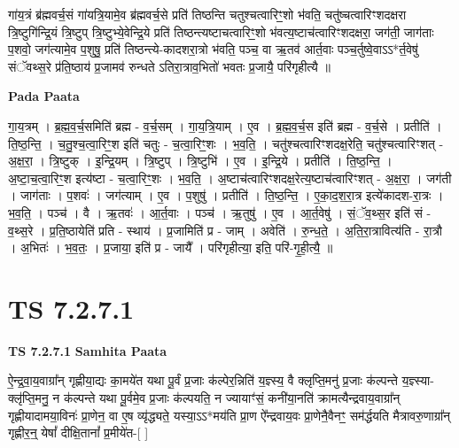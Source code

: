 \documentclass[17pt]{extarticle}
\begin{document}
गा॑य॒त्रं ब्र॑ह्मवर्च॒सं गा॑यत्रि॒यामे॒व ब्र॑ह्मवर्च॒से प्रति॑ तिष्ठन्ति चतुश्चत्वारिꣳ॒॒शो भ॑वति॒ चतु॑ष्चत्वारिꣳशदक्षरा त्रि॒ष्टुगि॑न्द्रि॒यं त्रि॒ष्टुप् त्रि॒ष्टुभ्ये॒वेन्द्रि॒ये प्रति॑ तिष्ठन्त्यष्टाचत्वारिꣳ॒॒शो भ॑वत्य॒ष्टाच॑त्वारिꣳशदक्षरा॒ जग॑ती॒ जाग॑ताः प॒शवो॒ जग॑त्यामे॒व प॒शुषु॒ प्रति॑ तिष्ठन्त्ये-कादशरा॒त्रो भ॑वति॒ पञ्च॒ वा ऋ॒तव॑ आर्त॒वाः पञ्च॒र्तुष्वे॒वाऽऽ*र्त॒वेषु॑ संॅवथ्स॒रे प्र॑ति॒ष्ठाय॑ प्र॒जामव॑ रुन्धते ऽतिरा॒त्राव॒भितो॑ भवतः प्र॒जायै॒ परि॑गृहीत्यै ॥ \newline

\textbf{Pada Paata} \newline

गा॒य॒त्रम् । ब्र॒ह्म॒व॒र्च॒समिति॑ ब्रह्म - व॒र्च॒सम् । गा॒य॒त्रि॒याम् । ए॒व । ब्र॒ह्म॒व॒र्च॒स इति॑ ब्रह्म - व॒र्च॒से । प्रतीति॑ । ति॒ष्ठ॒न्ति॒ । च॒तु॒श्च॒त्वा॒रिꣳ॒॒श इति॑ चतुः - च॒त्वा॒रिꣳ॒॒शः । भ॒व॒ति॒ । चतु॑श्चत्वारिꣳशदक्ष॒रेति॒ चतु॑श्चत्वारिꣳशत् - अ॒क्ष॒रा॒ । त्रि॒ष्टुक् । इ॒न्द्रि॒यम् । त्रि॒ष्टुप् । त्रि॒ष्टुभि॑ । ए॒व । इ॒न्द्रि॒ये । प्रतीति॑ । ति॒ष्ठ॒न्ति॒ । अ॒ष्टा॒च॒त्वा॒रिꣳ॒॒श इत्य॑ष्टा - च॒त्वा॒रिꣳ॒॒शः । भ॒व॒ति॒ । अ॒ष्टाच॑त्वारिꣳशदक्ष॒रेत्य॒ष्टाच॑त्वारिꣳशत् - अ॒क्ष॒रा॒ । जग॑ती । जाग॑ताः । प॒शवः॑ । जग॑त्याम् । ए॒व । प॒शुषु॑ । प्रतीति॑ । ति॒ष्ठ॒न्ति॒ । ए॒का॒द॒श॒रा॒त्र इत्ये॑कादश-रा॒त्रः । भ॒व॒ति॒ । पञ्च॑ । वै । ऋ॒तवः॑ । आ॒र्त॒वाः । पञ्च॑ । ऋ॒तुषु॑ । ए॒व । आ॒र्त॒वेषु॑ । सं॒ॅव॒थ्स॒र इति॑ सं - व॒थ्स॒रे । प्र॒ति॒ष्ठायेति॑ प्रति - स्थाय॑ । प्र॒जामिति॑ प्र - जाम् । अवेति॑ । रु॒न्ध॒ते॒ । अ॒ति॒रा॒त्रावित्य॑ति - रा॒त्रौ । अ॒भितः॑ । भ॒व॒तः॒ । प्र॒जाया॒ इति॑ प्र - जायै᳚ । परि॑गृहीत्या॒ इति॒ परि॑-गृ॒ही॒त्यै॒ ॥  \newline




\section*{ TS 7.2.7.1 }

\textbf{TS 7.2.7.1 } \newline
\textbf{Samhita Paata} \newline

ऐ॒न्द्र॒वा॒य॒वाग्रा᳚न् गृह्णीया॒द्यः का॒मये॑त यथा पू॒र्वं प्र॒जाः क॑ल्पेर॒न्निति॑ य॒ज्ञ्स्य॒ वै क्लृप्ति॒मनु॑ प्र॒जाः क॑ल्पन्ते य॒ज्ञ्स्या-क्लृ॑प्ति॒मनु॒ न क॑ल्पन्ते यथा पू॒र्वमे॒व प्र॒जाः क॑ल्पयति॒ न ज्यायाꣳ॑सं॒ कनी॑या॒नति॑ क्रामत्यैन्द्रवाय॒वाग्रा᳚न् गृह्णीयादामया॒विनः॑ प्रा॒णेन॒ वा ए॒ष व्यृ॑द्ध्यते॒ यस्या॒ऽऽ*मय॑ति प्रा॒ण ऐ᳚न्द्रवाय॒वः प्रा॒णेनै॒वैनꣳ॒॒ सम॑र्द्धयति मैत्रावरु॒णाग्रा᳚न् गृह्णीर॒न्॒ येषां᳚ दीक्षि॒तानां᳚ प्र॒मीये॑त-[  ] \newline
\end{document}
